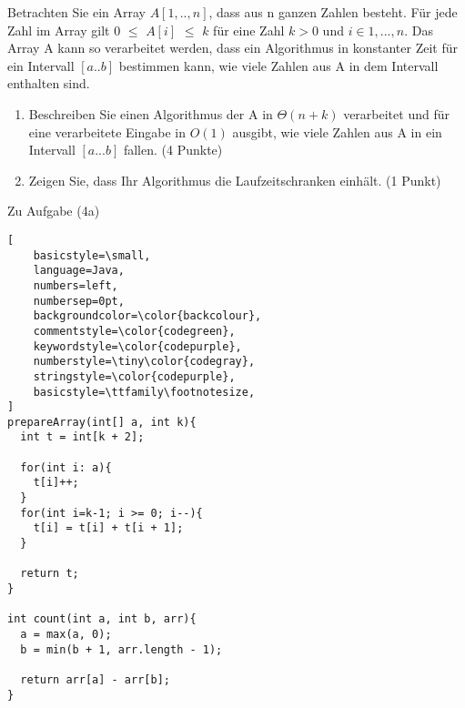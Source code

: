 \documentclass[ngerman,landscape,twocolumn]{adtexsheet}
\begin{document}
\newpage
\begin{question}
Betrachten Sie ein Array $A[1,..,n]$, dass aus n ganzen Zahlen besteht. Für jede Zahl
im Array gilt 0 $\leq$ $A[i]$ $\leq$ $k$ für eine Zahl $k > 0$ und $i \in {1, ..., n}$. Das Array A kann so verarbeitet werden, dass ein Algorithmus in konstanter Zeit für ein Intervall $[a..b]$ bestimmen kann, wie viele Zahlen aus A in dem Intervall enthalten sind.
    \begin{enumerate}
        \item Beschreiben Sie einen Algorithmus der A in $\Theta(n + k)$ verarbeitet und für eine
        verarbeitete Eingabe in $O(1)$ ausgibt, wie viele Zahlen aus A in ein Intervall $[a...b]$
        fallen. (4 Punkte)
        \item Zeigen Sie, dass Ihr Algorithmus die Laufzeitschranken einhält. (1 Punkt)
    \end{enumerate}
\end{question}

Zu Aufgabe (4a)
\begin{lstlisting}[
    basicstyle=\small,
    language=Java,
    numbers=left,                    
    numbersep=0pt,
    backgroundcolor=\color{backcolour},   
    commentstyle=\color{codegreen},
    keywordstyle=\color{codepurple},
    numberstyle=\tiny\color{codegray},
    stringstyle=\color{codepurple},
    basicstyle=\ttfamily\footnotesize,
]
prepareArray(int[] a, int k){
  int t = int[k + 2];

  for(int i: a){
    t[i]++;
  }
  for(int i=k-1; i >= 0; i--){
    t[i] = t[i] + t[i + 1];
  }

  return t;
}

int count(int a, int b, arr){
  a = max(a, 0);
  b = min(b + 1, arr.length - 1);
    
  return arr[a] - arr[b];
}
\end{lstlisting}
\end{document}

